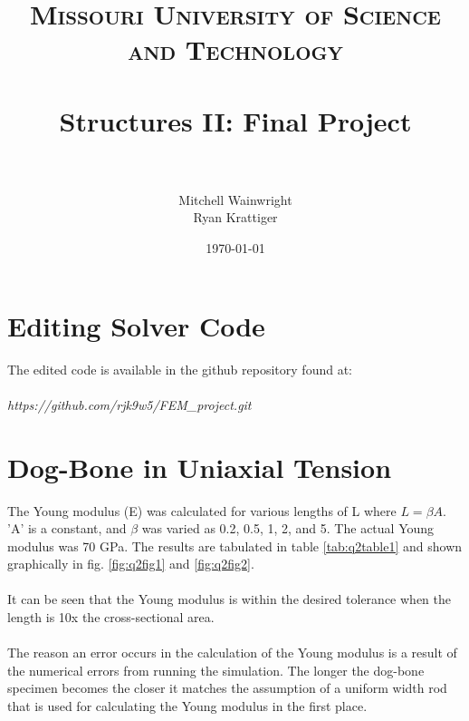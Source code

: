 \documentclass[paper=a4, fontsize=11pt]{scrartcl} %
\title{	
\normalfont \normalsize 
\textsc{Missouri University of Science and Technology} \\ [25pt] %
\horrule{0.5pt} \\[0.4cm] %
\huge Structures II: Final Project \\ %
\horrule{2pt} \\[0.5cm] %
}
\author{Mitchell Wainwright \\ Ryan Krattiger} %
\date{\normalsize\today} %
\numberwithin{equation}{section} %
\numberwithin{figure}{section} %
\numberwithin{table}{section} %
\begin{document}
\maketitle %


\section{Editing Solver Code}

The edited code is available in the github repository found at: \\\\
\textit {https://github.com/rjk9w5/FEM\_project.git} \\


\newpage
\section{Dog-Bone in Uniaxial Tension}

The Young modulus (E) was calculated for various lengths of L where $L = \beta A$. 'A' is a constant, and $\beta$ was varied as 0.2, 0.5, 1, 2, and 5. The actual Young modulus was 70 GPa. The results are tabulated in table \ref{tab:q2table1} and shown graphically in fig. \ref{fig:q2fig1} and \ref{fig:q2fig2}. \\
\\
It can be seen that the Young modulus is within the desired tolerance when the length is 10x the cross-sectional area. \\
\\
The reason an error occurs in the calculation of the Young modulus is a result of the numerical errors from running the simulation. The longer the dog-bone specimen becomes the closer it matches the assumption of a uniform width rod that is used for calculating the Young modulus in the first place.
\end{document}
